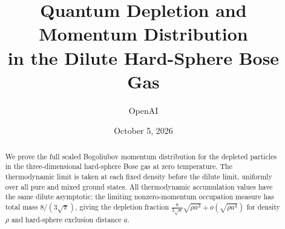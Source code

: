 \documentclass[11pt]{article}
\title{Quantum Depletion and Momentum Distribution\\in the Dilute Hard-Sphere Bose Gas}
\author{OpenAI}
\date{October 5, 2026}
\numberwithin{equation}{section}
\theoremstyle{definition}
\theoremstyle{remark}
\newcommand{\1}{\mathbf 1}
\begin{document}
\maketitle
\begin{abstract}
We prove the full scaled Bogoliubov momentum distribution for the depleted
particles in the three-dimensional hard-sphere Bose gas at zero
temperature. The thermodynamic limit is taken at each fixed density
before the dilute limit, uniformly over all pure and mixed ground states.
All thermodynamic accumulation values have the same dilute asymptotic:
the limiting nonzero-momentum occupation measure has total mass
$8/(3\sqrt\pi)$, giving the depletion fraction
$\frac{8}{3\sqrt\pi}\sqrt{\rho a^3}+o(\sqrt{\rho a^3})$ for density
$\rho$ and hard-sphere exclusion distance $a$.
\end{abstract}
\tableofcontents











\end{document}
